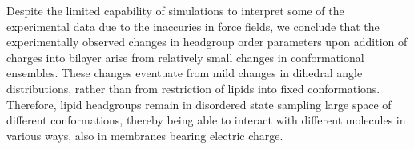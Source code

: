 \documentclass[aps,prl,superscriptaddress,twocolumn]{revtex4}
\begin{document}





Despite the limited capability of simulations to interpret some of the experimental data due to
the inaccuries in force fields, we conclude that the experimentally observed changes
in headgroup order parameters upon addition of charges into bilayer arise from relatively
small changes in conformational ensembles. These changes eventuate from
mild changes in dihedral angle distributions, rather than from restriction of lipids into
fixed conformations. Therefore, lipid headgroups remain in disordered state sampling large
space of different conformations, thereby being able to interact with different molecules
in various ways, also in membranes bearing electric charge.
\end{document}
